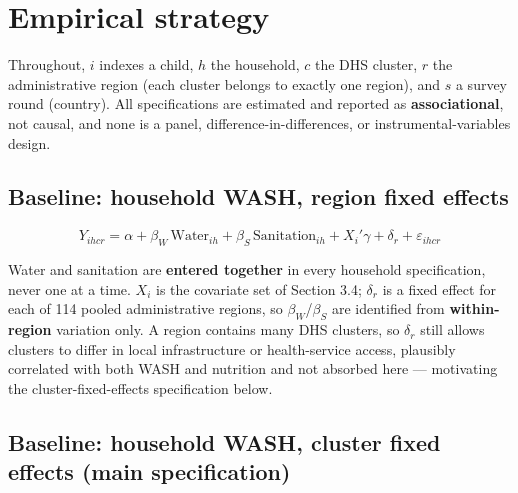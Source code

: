 
\section{Empirical strategy}\label{sec:4}

Throughout, \(i\) indexes a child, \(h\) the household, \(c\) the DHS cluster, \(r\) the administrative region (each cluster belongs to exactly one region), and \(s\) a survey round (country). All specifications are estimated and reported as \textbf{associational}, not causal, and none is a panel, difference-in-differences, or instrumental-variables design.

\subsection{Baseline: household WASH, region fixed effects}\label{sec:4.1}

\[Y_{ihcr} = \alpha + \beta_W\,\text{Water}_{ih} + \beta_S\,\text{Sanitation}_{ih} + X_i'\gamma + \delta_r + \varepsilon_{ihcr}\]

Water and sanitation are \textbf{entered together} in every household specification, never one at a time. \(X_i\) is the covariate set of Section 3.4; \(\delta_r\) is a fixed effect for each of 114 pooled administrative regions, so \(\beta_W\)/\(\beta_S\) are identified from \textbf{within-region} variation only. A region contains many DHS clusters, so \(\delta_r\) still allows clusters to differ in local infrastructure or health-service access, plausibly correlated with both WASH and nutrition and not absorbed here --- motivating the cluster-fixed-effects specification below.

\subsection{Baseline: household WASH, cluster fixed effects (main specification)}\label{sec:4.2}

